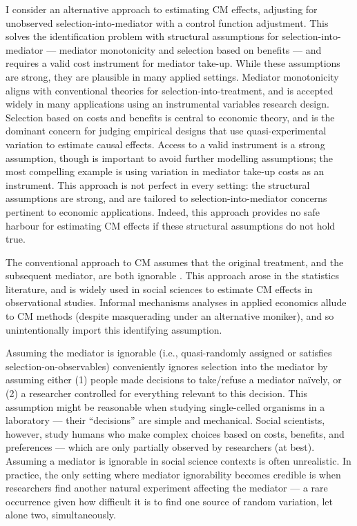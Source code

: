 I consider an alternative approach to estimating CM effects, adjusting for unobserved selection-into-mediator with a control function adjustment.
This solves the identification problem with structural assumptions for selection-into-mediator --- mediator monotonicity and selection based on benefits --- and requires a valid cost instrument for mediator take-up.
While these assumptions are strong, they are plausible in many applied settings.
Mediator monotonicity aligns with conventional theories for selection-into-treatment, and is accepted widely in many applications using an instrumental variables research design.
Selection based on costs and benefits is central to economic theory, and is the dominant concern for judging empirical designs that use quasi-experimental variation to estimate causal effects.
Access to a valid instrument is a strong assumption, though is important to avoid further modelling assumptions; the most compelling example is using variation in mediator take-up costs as an instrument.
This approach is not perfect in every setting: the structural assumptions are strong, and are tailored to selection-into-mediator concerns pertinent to economic applications.
Indeed, this approach provides no safe harbour for estimating CM effects if these structural assumptions do not hold true.

The conventional approach to CM assumes that the original treatment, and the subsequent mediator, are both ignorable \citep{imai2010identification}.
This approach arose in the statistics literature, and is widely used in social sciences to estimate CM effects in observational studies.
Informal mechanisms analyses in applied economics allude to CM methods (despite masquerading under an alternative moniker), and so unintentionally import this identifying assumption.

Assuming the mediator is ignorable (i.e., quasi-randomly assigned or satisfies selection-on-observables) conveniently ignores selection into the mediator by assuming either (1) people made decisions to take/refuse a mediator na\"ively, or (2) a researcher controlled for everything relevant to this decision.
This assumption might be reasonable when studying single-celled organisms in a laboratory --- their ``decisions'' are simple and mechanical.
Social scientists, however, study humans who make complex choices based on costs, benefits, and preferences --- which are only partially observed by researchers (at best).
Assuming a mediator is ignorable in social science contexts is often unrealistic.
In practice, the only setting where mediator ignorability becomes credible is when researchers find another natural experiment affecting the mediator --- a rare occurrence given how difficult it is to find one source of random variation, let alone two, simultaneously.

